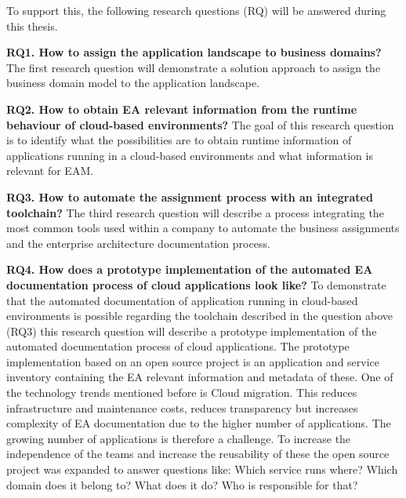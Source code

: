 To support this, the following research questions (RQ) will be answered during this thesis.

\textbf{RQ1. How to assign the application landscape to business domains?}
The first research question will demonstrate a solution approach to assign the business domain model to the application landscape.

\textbf{RQ2. How to obtain EA relevant information from the runtime behaviour of cloud-based environments?}
The goal of this research question is to identify what the possibilities are to obtain runtime information of applications running in a cloud-based environments and what information is relevant for EAM.

\textbf{RQ3. How to automate the assignment process with an integrated toolchain?}
The third research question will describe a process integrating the most common tools used within a company to automate the business assignments and the enterprise architecture documentation process.

\textbf{RQ4. How does a prototype implementation of the automated EA documentation process of cloud applications look like?}
To demonstrate that the automated documentation of application running in cloud-based environments is possible regarding the toolchain described in the question above (RQ3) this research question will describe a prototype implementation of the automated documentation process of cloud applications. The prototype implementation based on an open source project is an application and service inventory containing the EA relevant information and metadata of these. One of the technology trends mentioned before is Cloud migration. This reduces infrastructure and maintenance costs, reduces transparency but increases complexity of EA documentation due to the higher number of applications. The growing number of applications is therefore a challenge. To increase the independence of the teams and increase the reusability of these %
the open source project was expanded to answer questions like: Which service runs where? Which domain does it belong to? What does it do? Who is responsible for that?


